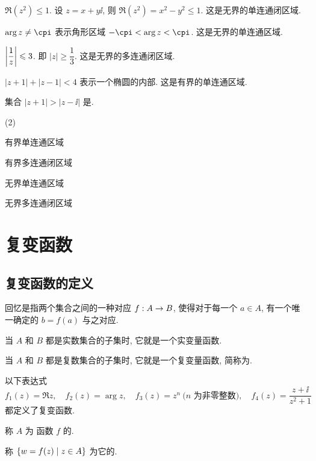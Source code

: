 \begin{exampleenum}
  \item $\Re(z^2)\le1$. 设 $z=x+y\ii$, 则 $\Re(z^2)=x^2-y^2\le1$. 这是无界的单连通闭区域.
  \item $\arg z\neq \cpi$ 表示角形区域 $-\cpi<\arg z<\cpi$. 这是无界的单连通区域.
  \smallskip
  \item $\left|\dfrac1z\right|\leqslant3$. 即 $|z|\ge\dfrac13$. 这是无界的多连通闭区域.
  \smallskip
  \item $|z+1|+|z-1|<4$ 表示一个椭圆的内部. 这是有界的单连通区域.
\end{exampleenum}

\begin{exercise}
  集合 $|z+1|>|z-\ii|$ 是\fillbrace{}.
  \begin{examplechoice}(2)
    \item 有界单连通区域
    \item 有界多连通闭区域
    \item 无界单连通区域
    \item 无界多连通闭区域
  \end{examplechoice}
\end{exercise}



\section{复变函数}

\subsection{复变函数的定义}

回忆是指两个集合之间的一种对应 $f:A\rightarrow B$, 使得对于每一个 $a\in A$, 有一个唯一确定的 $b=f(a)$ 与之对应.
\begin{enuma}
  \item 当 $A$ 和 $B$ 都是实数集合的子集时, 它就是一个实变量函数.
  \item 当 $A$ 和 $B$ 都是复数集合的子集时, 它就是一个复变量函数, 简称为.
\end{enuma}

\begin{example}
  以下表达式
  \[
    f_1(z)=\Re z,\quad
    f_2(z)=\arg z,\quad
    f_3(z)=z^n \ \text{($n$ 为非零整数)},\quad
    f_4(z)=\frac{z+\ii}{z^2+1}
  \]
  都定义了复变函数.
\end{example}

\begin{definition}
  \begin{enuma}
    \item 称 $A$ 为 函数 $f$ 的.
    \item 称 ${\left\{w=f(z)\mid z\in A\right\}}$ 为它的.\footnotemark
  \end{enuma} 
\end{definition}

